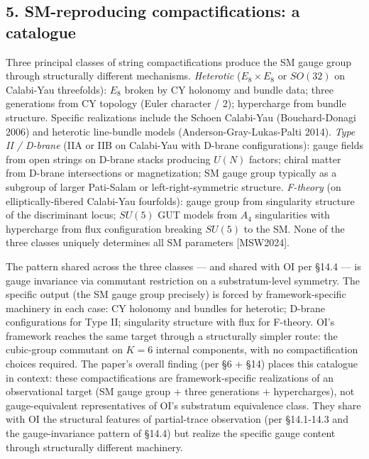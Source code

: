 \documentclass[
]{article}
\begin{document}
\hypertarget{sm-reproducing-compactifications-a-catalogue}{%
\subsection{5. SM-reproducing compactifications: a
catalogue}\label{sm-reproducing-compactifications-a-catalogue}}

Three principal classes of string compactifications produce the SM gauge
group through structurally different mechanisms. \emph{Heterotic}
(\(E_8 \times E_8\) or \(SO(32)\) on Calabi-Yau threefolds): \(E_8\)
broken by CY holonomy and bundle data; three generations from CY
topology (Euler character / 2); hypercharge from bundle structure.
Specific realizations include the Schoen Calabi-Yau (Bouchard-Donagi
2006) and heterotic line-bundle models (Anderson-Gray-Lukas-Palti 2014).
\emph{Type II / D-brane} (IIA or IIB on Calabi-Yau with D-brane
configurations): gauge fields from open strings on D-brane stacks
producing \(U(N)\) factors; chiral matter from D-brane intersections or
magnetization; SM gauge group typically as a subgroup of larger
Pati-Salam or left-right-symmetric structure. \emph{F-theory} (on
elliptically-fibered Calabi-Yau fourfolds): gauge group from singularity
structure of the discriminant locus; \(SU(5)\) GUT models from \(A_4\)
singularities with hypercharge from flux configuration breaking
\(SU(5)\) to the SM. None of the three classes uniquely determines all
SM parameters {[}MSW2024{]}.

The pattern shared across the three classes --- and shared with OI per
§14.4 --- is gauge invariance via commutant restriction on a
substratum-level symmetry. The specific output (the SM gauge group
precisely) is forced by framework-specific machinery in each case: CY
holonomy and bundles for heterotic; D-brane configurations for Type II;
singularity structure with flux for F-theory. OI's framework reaches the
same target through a structurally simpler route: the cubic-group
commutant on \(K = 6\) internal components, with no compactification
choices required. The paper's overall finding (per §6 + §14) places this
catalogue in context: these compactifications are framework-specific
realizations of an observational target (SM gauge group + three
generations + hypercharges), not gauge-equivalent representatives of
OI's substratum equivalence class. They share with OI the structural
features of partial-trace observation (per §14.1-14.3 and the
gauge-invariance pattern of §14.4) but realize the specific gauge
content through structurally different machinery.
\end{document}
